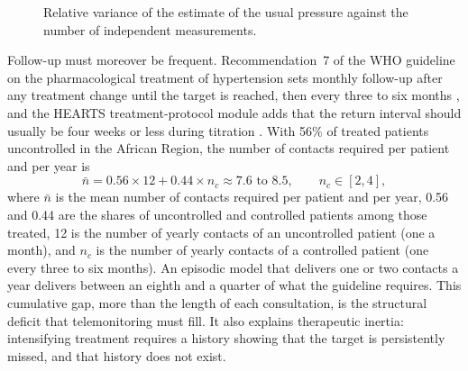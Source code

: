\documentclass[11pt,a4paper,oneside]{report}
\begin{document}
\begin{figure}[htbp]
\centering
{}
\caption{Relative variance of the estimate of the usual pressure against the number of independent measurements.}\label{fig:variability}
\end{figure}

Follow-up must moreover be frequent. Recommendation~7 of the WHO guideline on the pharmacological treatment of hypertension sets monthly follow-up after any treatment change until the target is reached, then every three to six months \parencite{who2021guideline}, and the HEARTS treatment-protocol module adds that the return interval should usually be four weeks or less during titration \parencite{whoHEARTS}. With 56\% of treated patients uncontrolled in the African Region, the number of contacts required per patient and per year is
\begin{equation}
  \bar n = 0.56 \times 12 + 0.44 \times n_c \approx 7.6 \text{ to } 8.5, \qquad n_c \in [2,4],
\end{equation}
where $\bar n$ is the mean number of contacts required per patient and per year, 0.56 and 0.44 are the shares of uncontrolled and controlled patients among those treated, 12 is the number of yearly contacts of an uncontrolled patient (one a month), and $n_c$ is the number of yearly contacts of a controlled patient (one every three to six months). An episodic model that delivers one or two contacts a year delivers between an eighth and a quarter of what the guideline requires. This cumulative gap, more than the length of each consultation, is the structural deficit that telemonitoring must fill. It also explains therapeutic inertia: intensifying treatment requires a history showing that the target is persistently missed, and that history does not exist.
\end{document}

